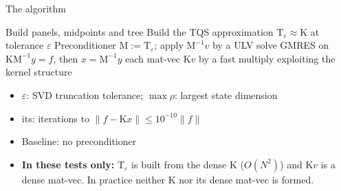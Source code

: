 \documentclass[aspectratio=169,11pt]{beamer}
\begin{document}
\begin{frame}{The algorithm}
\small
\begin{algorithm}[H]
\caption{TQS-preconditioned Krylov solve}
\begin{algorithmic}[1]
\State Build panels, midpoints and tree
\State Build the TQS approximation $\mathrm{T}_\varepsilon\approx\mathrm{K}$ at tolerance $\varepsilon$
\State Preconditioner $\mathrm{M}:=\mathrm{T}_\varepsilon$; apply $\mathrm{M}^{-1}v$ by a ULV solve
\State GMRES on $\mathrm{K}\mathrm{M}^{-1}y=f$, then $x=\mathrm{M}^{-1}y$
\Statex \hspace{\algorithmicindent}each mat-vec $\mathrm{K}v$ by a fast multiply exploiting the kernel structure
\end{algorithmic}
\end{algorithm}
\begin{itemize}
\item $\varepsilon$: SVD truncation tolerance; $\max\rho$: largest state dimension
\item its: iterations to $\|f-\mathrm{K}x\|\le10^{-10}\|f\|$
\item Baseline: no preconditioner
\item \textbf{In these tests only:} $\mathrm{T}_\varepsilon$ is built from the dense $\mathrm{K}$ ($O(N^2)$) and $\mathrm{K}v$ is a dense mat-vec. In practice neither $\mathrm{K}$ nor its dense mat-vec is formed.
\end{itemize}
\end{frame}
\end{document}
